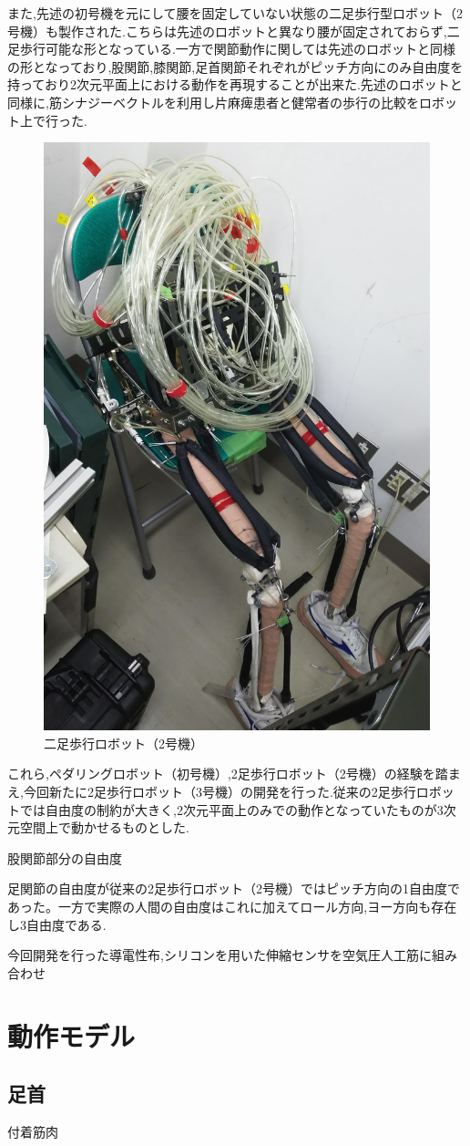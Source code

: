 また,先述の初号機を元にして腰を固定していない状態の二足歩行型ロボット（2号機）も製作された.こちらは先述のロボットと異なり腰が固定されておらず,二足歩行可能な形となっている.一方で関節動作に関しては先述のロボットと同様の形となっており,股関節,膝関節,足首関節それぞれがピッチ方向にのみ自由度を持っており2次元平面上における動作を再現することが出来た.先述のロボットと同様に,筋シナジーベクトルを利用し片麻痺患者と健常者の歩行の比較をロボット上で行った.
\begin{figure}[h]
  \begin{center}
  \includegraphics[width=0.275\columnwidth,clip]{Photo/BackGround/2nd.eps}
  \caption{二足歩行ロボット（2号機）}
  \label{2号機}
 \end{center}
\end{figure}

これら,ペダリングロボット（初号機）,2足歩行ロボット（2号機）の経験を踏まえ,今回新たに2足歩行ロボット（3号機）の開発を行った.従来の2足歩行ロボットでは自由度の制約が大きく,2次元平面上のみでの動作となっていたものが3次元空間上で動かせるものとした.

股関節部分の自由度

足関節の自由度が従来の2足歩行ロボット（2号機）ではピッチ方向の1自由度であった。一方で実際の人間の自由度はこれに加えてロール方向,ヨー方向も存在し3自由度である.

今回開発を行った導電性布,シリコンを用いた伸縮センサを空気圧人工筋に組み合わせ
\section{動作モデル}
\subsection{足首}
付着筋肉 %

